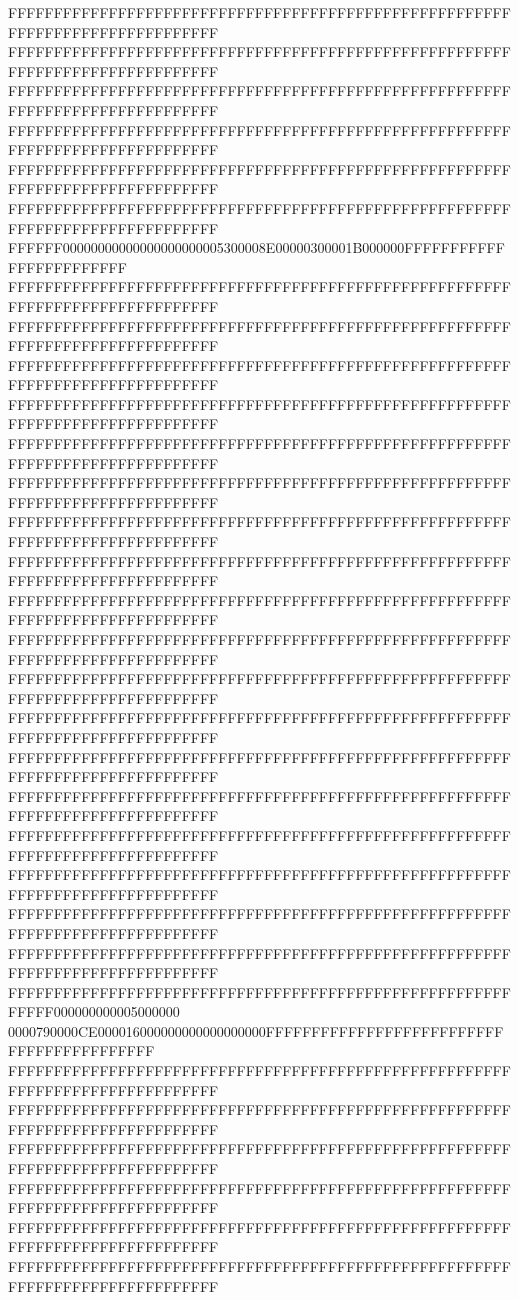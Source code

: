 FFFFFFFFFFFFFFFFFFFFFFFFFFFFFFFFFFFFFFFFFFFFFFFFFFFFFFFFFFFFFFFFFFFFFFFFFFFFFF
FFFFFFFFFFFFFFFFFFFFFFFFFFFFFFFFFFFFFFFFFFFFFFFFFFFFFFFFFFFFFFFFFFFFFFFFFFFFFF
FFFFFFFFFFFFFFFFFFFFFFFFFFFFFFFFFFFFFFFFFFFFFFFFFFFFFFFFFFFFFFFFFFFFFFFFFFFFFF
FFFFFFFFFFFFFFFFFFFFFFFFFFFFFFFFFFFFFFFFFFFFFFFFFFFFFFFFFFFFFFFFFFFFFFFFFFFFFF
FFFFFFFFFFFFFFFFFFFFFFFFFFFFFFFFFFFFFFFFFFFFFFFFFFFFFFFFFFFFFFFFFFFFFFFFFFFFFF
FFFFFFFFFFFFFFFFFFFFFFFFFFFFFFFFFFFFFFFFFFFFFFFFFFFFFFFFFFFFFFFFFFFFFFFFFFFFFF
FFFFFF00000000000000000000005300008E00000300001B000000FFFFFFFFFFFFFFFFFFFFFFFF
FFFFFFFFFFFFFFFFFFFFFFFFFFFFFFFFFFFFFFFFFFFFFFFFFFFFFFFFFFFFFFFFFFFFFFFFFFFFFF
FFFFFFFFFFFFFFFFFFFFFFFFFFFFFFFFFFFFFFFFFFFFFFFFFFFFFFFFFFFFFFFFFFFFFFFFFFFFFF
FFFFFFFFFFFFFFFFFFFFFFFFFFFFFFFFFFFFFFFFFFFFFFFFFFFFFFFFFFFFFFFFFFFFFFFFFFFFFF
FFFFFFFFFFFFFFFFFFFFFFFFFFFFFFFFFFFFFFFFFFFFFFFFFFFFFFFFFFFFFFFFFFFFFFFFFFFFFF
FFFFFFFFFFFFFFFFFFFFFFFFFFFFFFFFFFFFFFFFFFFFFFFFFFFFFFFFFFFFFFFFFFFFFFFFFFFFFF
FFFFFFFFFFFFFFFFFFFFFFFFFFFFFFFFFFFFFFFFFFFFFFFFFFFFFFFFFFFFFFFFFFFFFFFFFFFFFF
FFFFFFFFFFFFFFFFFFFFFFFFFFFFFFFFFFFFFFFFFFFFFFFFFFFFFFFFFFFFFFFFFFFFFFFFFFFFFF
FFFFFFFFFFFFFFFFFFFFFFFFFFFFFFFFFFFFFFFFFFFFFFFFFFFFFFFFFFFFFFFFFFFFFFFFFFFFFF
FFFFFFFFFFFFFFFFFFFFFFFFFFFFFFFFFFFFFFFFFFFFFFFFFFFFFFFFFFFFFFFFFFFFFFFFFFFFFF
FFFFFFFFFFFFFFFFFFFFFFFFFFFFFFFFFFFFFFFFFFFFFFFFFFFFFFFFFFFFFFFFFFFFFFFFFFFFFF
FFFFFFFFFFFFFFFFFFFFFFFFFFFFFFFFFFFFFFFFFFFFFFFFFFFFFFFFFFFFFFFFFFFFFFFFFFFFFF
FFFFFFFFFFFFFFFFFFFFFFFFFFFFFFFFFFFFFFFFFFFFFFFFFFFFFFFFFFFFFFFFFFFFFFFFFFFFFF
FFFFFFFFFFFFFFFFFFFFFFFFFFFFFFFFFFFFFFFFFFFFFFFFFFFFFFFFFFFFFFFFFFFFFFFFFFFFFF
FFFFFFFFFFFFFFFFFFFFFFFFFFFFFFFFFFFFFFFFFFFFFFFFFFFFFFFFFFFFFFFFFFFFFFFFFFFFFF
FFFFFFFFFFFFFFFFFFFFFFFFFFFFFFFFFFFFFFFFFFFFFFFFFFFFFFFFFFFFFFFFFFFFFFFFFFFFFF
FFFFFFFFFFFFFFFFFFFFFFFFFFFFFFFFFFFFFFFFFFFFFFFFFFFFFFFFFFFFFFFFFFFFFFFFFFFFFF
FFFFFFFFFFFFFFFFFFFFFFFFFFFFFFFFFFFFFFFFFFFFFFFFFFFFFFFFFFFFFFFFFFFFFFFFFFFFFF
FFFFFFFFFFFFFFFFFFFFFFFFFFFFFFFFFFFFFFFFFFFFFFFFFFFFFFFFFFFFFFFFFFFFFFFFFFFFFF
FFFFFFFFFFFFFFFFFFFFFFFFFFFFFFFFFFFFFFFFFFFFFFFFFFFFFFFFFFFF000000000005000000
0000790000CE000016000000000000000000FFFFFFFFFFFFFFFFFFFFFFFFFFFFFFFFFFFFFFFFFF
FFFFFFFFFFFFFFFFFFFFFFFFFFFFFFFFFFFFFFFFFFFFFFFFFFFFFFFFFFFFFFFFFFFFFFFFFFFFFF
FFFFFFFFFFFFFFFFFFFFFFFFFFFFFFFFFFFFFFFFFFFFFFFFFFFFFFFFFFFFFFFFFFFFFFFFFFFFFF
FFFFFFFFFFFFFFFFFFFFFFFFFFFFFFFFFFFFFFFFFFFFFFFFFFFFFFFFFFFFFFFFFFFFFFFFFFFFFF
FFFFFFFFFFFFFFFFFFFFFFFFFFFFFFFFFFFFFFFFFFFFFFFFFFFFFFFFFFFFFFFFFFFFFFFFFFFFFF
FFFFFFFFFFFFFFFFFFFFFFFFFFFFFFFFFFFFFFFFFFFFFFFFFFFFFFFFFFFFFFFFFFFFFFFFFFFFFF
FFFFFFFFFFFFFFFFFFFFFFFFFFFFFFFFFFFFFFFFFFFFFFFFFFFFFFFFFFFFFFFFFFFFFFFFFFFFFF
